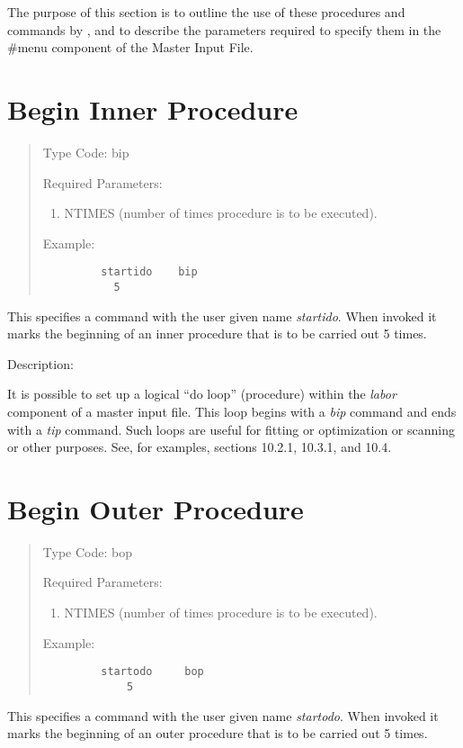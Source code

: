      The purpose of this section is to outline the use of these procedures
and commands by \Maryend, and to describe the parameters required to specify
them in the \#menu component of the Master Input File.

\newpage
\section{Begin Inner Procedure}    
\begin{quotation}
\noindent Type Code:  bip
\vspace{5mm}

\noindent Required Parameters:
\begin{enumerate}
      \item  NTIMES (number of times procedure is to be executed).
\end{enumerate}

\vspace{5mm}
\noindent Example:
\begin{verbatim}
         startido    bip
           5
\end{verbatim}
\end{quotation}
This specifies a command with the user given name {\em startido}.  When invoked it marks the beginning of an inner procedure that is to be carried out 5 times.

\vspace{5mm}
     Description:
\vspace{2mm}

It is possible to set up a logical ``do loop'' (procedure) within the {\em labor} component of a \Mary master input file.  This loop begins with a {\em bip} command and ends with a {\em tip} command.  Such loops are useful for fitting or optimization or scanning or other purposes.  See, for examples, sections 10.2.1, 10.3.1, and 10.4.

\newpage
\section{Begin Outer Procedure}   
\begin{quotation}
\noindent Type Code:  bop
\vspace{5mm}

\noindent Required Parameters:
\begin{enumerate}
       \item  NTIMES (number of times procedure is to be executed).
\end{enumerate}

\vspace{5mm}
\noindent Example:
\begin{verbatim}
         startodo     bop
             5
\end{verbatim}
\end{quotation}
This specifies a command with the user given name {\em startodo}.  When invoked it marks the beginning of an outer procedure that is to be carried out 5 times.

